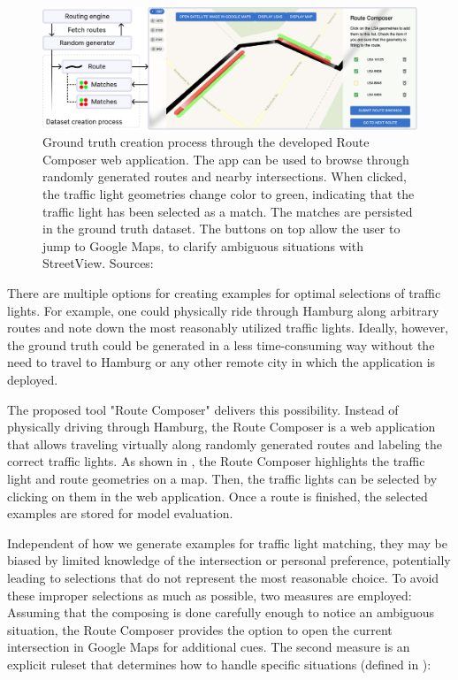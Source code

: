 \begin{figure}[t]
\centering
\includegraphics[width=\linewidth]{images/sg-selection-ground-truth.pdf}
\caption{Ground truth creation process through the developed Route Composer web application. The app can be used to browse through randomly generated routes and nearby intersections. When clicked, the traffic light geometries change color to green, indicating that the traffic light has been selected as a match. The matches are persisted in the ground truth dataset. The buttons on top allow the user to jump to Google Maps, to clarify ambiguous situations with StreetView. Sources: \cite{matthes2022matching, matthes2023geo}}
\label{fig:sg-selection-ground-truth}
\end{figure}

There are multiple options for creating examples for optimal selections of traffic lights. For example, one could physically ride through Hamburg along arbitrary routes and note down the most reasonably utilized traffic lights. Ideally, however, the ground truth could be generated in a less time-consuming way without the need to travel to Hamburg or any other remote city in which the application is deployed. 

The proposed tool "Route Composer" delivers this possibility. Instead of physically driving through Hamburg, the Route Composer is a web application that allows traveling virtually along randomly generated routes and labeling the correct traffic lights. As shown in , the Route Composer highlights the traffic light and route geometries on a map. Then, the traffic lights can be selected by clicking on them in the web application. Once a route is finished, the selected examples are stored for model evaluation.

Independent of how we generate examples for traffic light matching, they may be biased by limited knowledge of the intersection or personal preference, potentially leading to selections that do not represent the most reasonable choice. To avoid these improper selections as much as possible, two measures are employed: Assuming that the composing is done carefully enough to notice an ambiguous situation, the Route Composer provides the option to open the current intersection in Google Maps for additional cues. The second measure is an explicit ruleset that determines how to handle specific situations (defined in \cite{matthes2023geo}):

